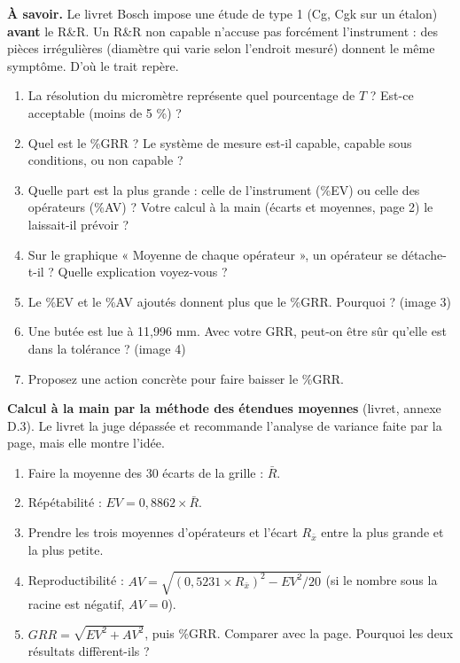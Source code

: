 \documentclass[10pt,a4paper]{article}
\begin{document}
\vspace{3pt}{\small Ligne « Moyenne » : sous les séries, la moyenne des 20 mesures de l'opérateur (image 2) ; dans la colonne « Écart », la moyenne de ses 10 écarts (image 1).}

\begin{tcolorbox}[boite]
\textbf{À savoir.} Le livret Bosch impose une étude de type 1 (Cg, Cgk sur un étalon) \textbf{avant} le R\&R.
Un R\&R non capable n'accuse pas forcément l'instrument : des pièces irrégulières (diamètre qui varie selon l'endroit mesuré) donnent le même symptôme. D'où le trait repère.
\end{tcolorbox}

\newpage
{}
\begin{enumerate}[label=\textcolor{cyan}{\textbf{Q\arabic*.}},leftmargin=22pt]
\item La résolution du micromètre représente quel pourcentage de $T$ ? Est-ce acceptable (moins de 5 \%) ?\reponse
\item Quel est le \%GRR ? Le système de mesure est-il capable, capable sous conditions, ou non capable ?\reponse
\item Quelle part est la plus grande : celle de l'instrument (\%EV) ou celle des opérateurs (\%AV) ? Votre calcul à la main (écarts et moyennes, page 2) le laissait-il prévoir ?\reponse[2]
\item Sur le graphique « Moyenne de chaque opérateur », un opérateur se détache-t-il ? Quelle explication voyez-vous ?\reponse[2]
\item Le \%EV et le \%AV ajoutés donnent plus que le \%GRR. Pourquoi ? (image 3)\reponse[2]
\item Une butée est lue à 11,996 mm. Avec votre GRR, peut-on être sûr qu'elle est dans la tolérance ? (image 4)\reponse[2]
\item Proposez une action concrète pour faire baisser le \%GRR.\reponse[2]
\end{enumerate}

\begin{tcolorbox}[defi]
\textbf{Calcul à la main par la méthode des étendues moyennes} (livret, annexe D.3). Le livret la juge dépassée et recommande l'analyse de variance faite par la page, mais elle montre l'idée.
\begin{enumerate}[label=\textbf{\alph*.},leftmargin=14pt]
\item Faire la moyenne des 30 écarts de la grille : $\bar R$.
\item Répétabilité : $EV = 0{,}8862 \times \bar R$.
\item Prendre les trois moyennes d'opérateurs et l'écart $R_{\bar x}$ entre la plus grande et la plus petite.
\item Reproductibilité : $AV=\sqrt{(0{,}5231\times R_{\bar x})^2 - EV^2/20}$ (si le nombre sous la racine est négatif, $AV = 0$).
\item $GRR=\sqrt{EV^2+AV^2}$, puis \%GRR. Comparer avec la page. Pourquoi les deux résultats diffèrent-ils ?
\end{enumerate}
\end{tcolorbox}
\end{document}
